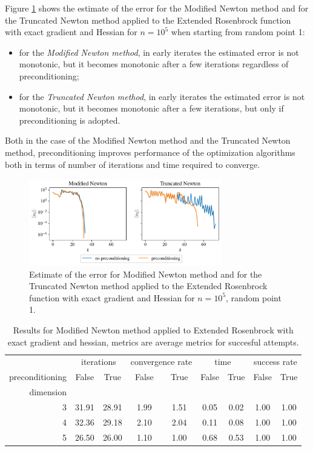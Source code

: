 Figure \ref{fig:extended_rosenbrock_error} shows the estimate of the error for the Modified Newton method and for the Truncated Newton method applied to the Extended Rosenbrock function with exact gradient and Hessian for $n=10^5$ when starting from random point 1:
\begin{itemize}
\item for the \textit{Modified Newton method}, in early iterates the estimated error is not monotonic, but it becomes monotonic after a few iterations regardless of preconditioning;
\item for the \textit{Truncated Newton method}, in early iterates the estimated error is not monotonic, but it becomes monotonic after a few iterations, but only if preconditioning is adopted.
\end{itemize}
Both in the case of the Modified Newton method and the Truncated Newton method, preconditioning improves performance of the optimization algorithms both in terms of number of iterations and time required to converge.

\begin{figure}
    \centering
    \includegraphics[width=0.75\textwidth]{figures/extended_rosenbrock_error.pdf}
    \caption{Estimate of the error for Modified Newton method and for the Truncated Newton method applied to the Extended Rosenbrock function with exact gradient and Hessian for $n=10^5$, random point 1.}
    \label{fig:extended_rosenbrock_error}
\end{figure}

\begin{table}
\centering
\caption{Results for Modified Newton method applied to Extended Rosenbrock with exact gradient and hessian, metrics are average metrics for succesful attempts.}
\label{tab:Modified_Newton_Extended_Rosenbrock_exact}
\begin{tabular}{r|cc|cc|cc|cc}
\toprule
    & \multicolumn{2}{|c}{iterations} & \multicolumn{2}{|c}{convergence rate} & \multicolumn{2}{|c}{time} & \multicolumn{2}{|c}{success rate} \\
preconditioning & False & True & False & True & False & True & False & True \\
dimension &  &  &  &  &  &  &  &  \\
\midrule
3 & 31.91 & 28.91 & 1.99 & 1.51 & 0.05 & 0.02 & 1.00 & 1.00 \\
4 & 32.36 & 29.18 & 2.10 & 2.04 & 0.11 & 0.08 & 1.00 & 1.00 \\
5 & 26.50 & 26.00 & 1.10 & 1.00 & 0.68 & 0.53 & 1.00 & 1.00 \\
\bottomrule
\end{tabular}
\end{table}

